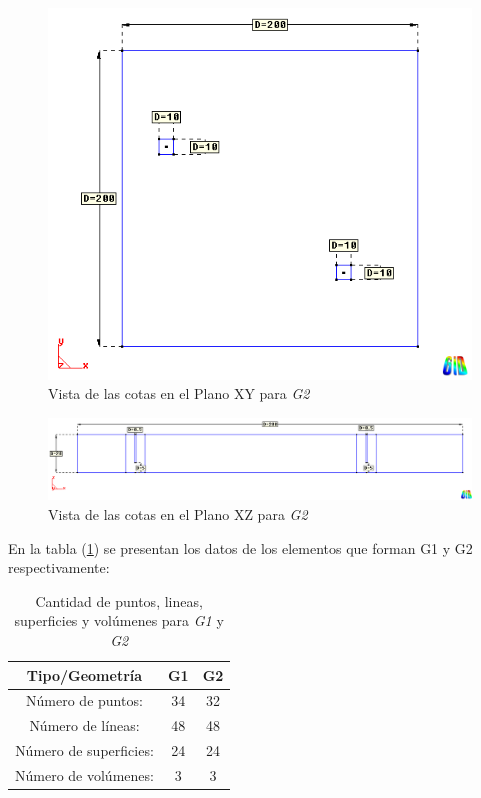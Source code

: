 \documentclass[10pt,a4paper,final]{article}
\begin{document}
%
%
\begin{figure}[tbhp]
\centerline{\includegraphics[scale=0.5]{img/200m/200_xy_cotas}}
\caption{Vista de las cotas en el Plano XY para \emph{G2}}
\label{200_xy_cotas}
\end{figure}
%
\begin{figure}[tbhp]
\centerline{\includegraphics[scale=0.4]{img/200m/200_xz_cotas}}
\caption{Vista de las cotas en el Plano XZ para \emph{G2}}
\label{200_xz_cotas}
\end{figure}
%
En la tabla (\ref{tabla_lista_entidades}) se presentan los datos de los elementos que forman G1 y G2 respectivamente:
%
\begin{table}[tbhp]
\begin{center}\begin{tabular}{ccc}
\hline \textbf{Tipo/Geometría} & \textbf{G1} & \textbf{G2} \\ 
\hline Número de puntos: & 34 & 32 \\ 
\hline Número de líneas: & 48 & 48 \\ 
\hline Número de superficies: & 24 & 24 \\ 
\hline Número de volúmenes: & 3 & 3 \\ 
\hline 
\end{tabular}\end{center}
\caption{Cantidad de puntos, lineas, superficies y volúmenes para \emph{G1} y \emph{G2}}
\label{tabla_lista_entidades}
\end{table}
%
%
\end{document}
